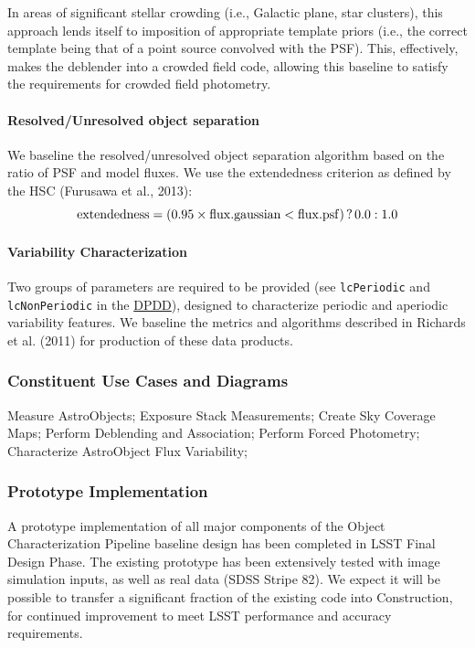\documentclass[12pt]{article}
\newcommand{\ds}[2]{{\color{blue} \href{https://docushare.lsstcorp.org/docushare/dsweb/Get/#1}{#2}}\xspace}
\newcommand{\DPDD}{\ds{LSE-163}{DPDD}}
\begin{document}
In areas of significant stellar crowding (i.e., Galactic plane, star clusters), this approach lends itself to imposition of appropriate template priors (i.e., the correct template being that of a point source convolved with the PSF). This, effectively, makes the deblender into a crowded field code, allowing this baseline to satisfy the requirements for crowded field photometry.

\paragraph{Resolved/Unresolved object separation}
\label{alg:star-galaxy}

We baseline the resolved/unresolved object separation algorithm based on the ratio of PSF and model fluxes. We use the extendedness criterion as defined by the HSC (Furusawa et al., 2013):
\begin{equation}
{\rm extendedness} = (0.95\times {\rm flux.gaussian} < {\rm flux.psf})\, ?\, 0.0 : 1.0 \nonumber
\end{equation}

\paragraph{Variability Characterization}

       Two groups of parameters are required to be provided (see {\tt lcPeriodic} and {\tt lcNonPeriodic} in the \DPDD), designed to characterize periodic and aperiodic variability features. We baseline the metrics and algorithms described in Richards et al. (2011) for production of these data products.

\subsubsection{Constituent Use Cases and Diagrams}

Measure AstroObjects;
Exposure Stack Measurements;
Create Sky Coverage Maps;
Perform Deblending and Association;
Perform Forced Photometry;
Characterize AstroObject Flux Variability;

\subsubsection{Prototype Implementation}

A prototype implementation of all major components of the Object Characterization Pipeline baseline design has been completed in LSST Final Design Phase. The existing prototype has been extensively tested with image simulation inputs, as well as real data (SDSS Stripe 82). We expect it will be possible to transfer a significant fraction of the existing code into Construction, for continued improvement to meet LSST performance and accuracy requirements.
\\
\end{document}

